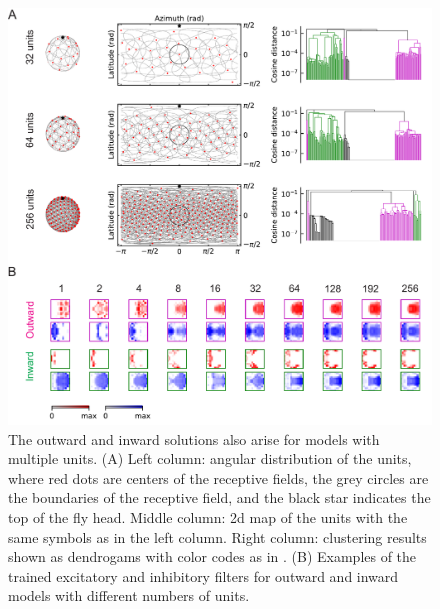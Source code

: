\documentclass[pdftex,9pt,lineno]{elife}
\begin{document}
\begin{figure}
\includegraphics[width=\linewidth]{figures/trained_results_multicells_paper.pdf}
\caption{The outward and inward solutions also arise for models with multiple units. (A) Left column: angular distribution of the units, where red dots are centers of the receptive fields, the grey circles are the boundaries of the receptive field, and the black star indicates the top of the fly head. Middle column: 2d map of the units with the same symbols as in the left column. Right column: clustering results shown as dendrogams with color codes as in . (B) Examples of the trained excitatory and inhibitory filters for outward and inward models with different numbers of units.}
\label{fig:trainedResMultiUnit}

\end{figure}
\end{document}
